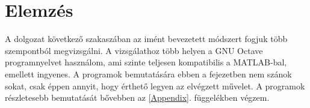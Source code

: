 \documentclass[a4paper,12pt]{report}
\begin{document}






\section{Elemzés}




                
                A dolgozat következő szakaszában az imént bevezetett módszert fogjuk több szempontból megvizsgálni. A vizsgálathoz több helyen a GNU Octave programnyelvet használom, ami szinte teljesen kompatibilis a MATLAB-bal, emellett ingyenes. A programok bemutatására ebben a fejezetben nem szánok sokat, csak éppen annyit, hogy érthető legyen az elvégzett művelet. A programok részletesebb bemutatását bővebben az \ref{Appendix}. függelékben végzem.
				
\end{document}
